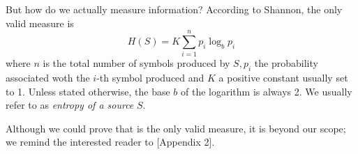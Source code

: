 \documentclass{subfiles}
\begin{document}
    But how do we actually measure information? According to Shannon, 
        the only valid measure is 
        \begin{equation}\label{eq:shannonEntropy}
            H(S) = K \sum_{i = 1}^{n} {p_{i} \log_{b} p_{i}}
        \end{equation}
        where \(n\) is the total number of symbols produced by \(S, p_{i}\)
        the probability associated woth the \(i\)-th symbol produced and \(K\) a 
        positive constant usually set to 1.
        Unless stated otherwise, the base \(b\) of the logarithm is always 2.
        We usually refer to  as \emph{entropy of a source} \(S\).
    
    Although we could prove that  is the only valid measure,
        it is beyond our scope; we remind the interested reader to \cite{shannon1948}[Appendix 2].
\end{document}
